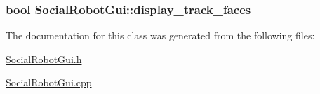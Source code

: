 \hypertarget{classSocialRobotGui_a28e6dc7627b92c85adb014bcaeb641bd}{
\subsubsection[{display\-\_\-track\-\_\-faces}]{\setlength{\rightskip}{0pt plus 5cm}bool Social\-Robot\-Gui\-::display\-\_\-track\-\_\-faces}}\label{classSocialRobotGui_a28e6dc7627b92c85adb014bcaeb641bd}


The documentation for this class was generated from the following files\-:\begin{DoxyCompactItemize}
\item 
\hyperlink{SocialRobotGui_8h}{Social\-Robot\-Gui.\-h}\item 
\hyperlink{SocialRobotGui_8cpp}{Social\-Robot\-Gui.\-cpp}\end{DoxyCompactItemize}
